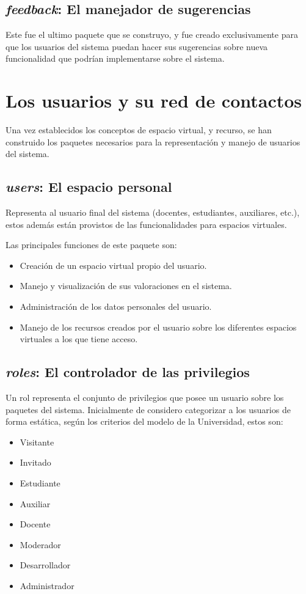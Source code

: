 \subsection{\emph{feedback}: El manejador de sugerencias}
Este fue el ultimo paquete que se construyo, y fue creado exclusivamente para
que los usuarios del sistema puedan hacer sus sugerencias sobre nueva
funcionalidad que podrían implementarse sobre el sistema.

\section{Los usuarios y su red de contactos}
Una vez establecidos los conceptos de espacio virtual, y recurso, se han
construido los paquetes necesarios para la representación y manejo de usuarios
del sistema.

\subsection{\emph{users}: El espacio personal}
Representa al usuario final del sistema (docentes, estudiantes, auxiliares,
etc.), estos además están provistos de las funcionalidades para espacios
virtuales.

Las principales funciones de este paquete son:

\begin{itemize}
\item Creación de un espacio virtual propio del usuario.
\item Manejo y visualización de sus valoraciones en el sistema.
\item Administración de los datos personales del usuario.
\item Manejo de los recursos creados por el usuario sobre los diferentes
espacios virtuales a los que tiene acceso.
\end{itemize}

\subsection{\emph{roles}: El controlador de las privilegios}
Un rol representa el conjunto de privilegios que posee un usuario sobre los
paquetes del sistema.
Inicialmente de considero categorizar a los usuarios de forma estática, según
los criterios del modelo de la Universidad, estos son:

\begin{itemize}
\item Visitante
\item Invitado
\item Estudiante
\item Auxiliar
\item Docente
\item Moderador
\item Desarrollador
\item Administrador
\end{itemize}

